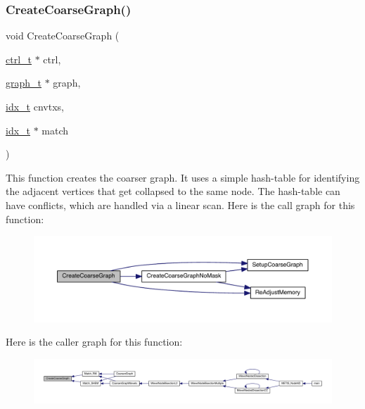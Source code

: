\mbox{\label{a00945_aac8820421b1c25698140c1b470c50e07}} 
\subsubsection{\texorpdfstring{Create\+Coarse\+Graph()}{CreateCoarseGraph()}}
{\footnotesize\ttfamily void Create\+Coarse\+Graph (\begin{DoxyParamCaption}\item[{\hyperlink{a00742}{ctrl\+\_\+t} $\ast$}]{ctrl,  }\item[{\hyperlink{a00734}{graph\+\_\+t} $\ast$}]{graph,  }\item[{\hyperlink{a00876_aaa5262be3e700770163401acb0150f52}{idx\+\_\+t}}]{cnvtxs,  }\item[{\hyperlink{a00876_aaa5262be3e700770163401acb0150f52}{idx\+\_\+t} $\ast$}]{match }\end{DoxyParamCaption})}

This function creates the coarser graph. It uses a simple hash-\/table for identifying the adjacent vertices that get collapsed to the same node. The hash-\/table can have conflicts, which are handled via a linear scan. Here is the call graph for this function\+:\nopagebreak
\begin{figure}[H]
\begin{center}
\leavevmode
\includegraphics[width=350pt]{a00945_aac8820421b1c25698140c1b470c50e07_cgraph}
\end{center}
\end{figure}
Here is the caller graph for this function\+:\nopagebreak
\begin{figure}[H]
\begin{center}
\leavevmode
\includegraphics[width=350pt]{a00945_aac8820421b1c25698140c1b470c50e07_icgraph}
\end{center}
\end{figure}
\mbox{\label{a00945_a70dc59d4c7190507e7ad9a4cc0d80707}} 
